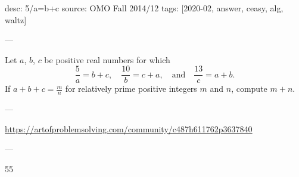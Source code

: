 desc: 5/a=b+c
source: OMO Fall 2014/12
tags: [2020-02, answer, ceasy, alg, waltz]

---

Let $a$, $b$, $c$ be positive real numbers for which\[
    \frac{5}{a} = b+c, \quad
    \frac{10}{b} = c+a, \quad \text{and} \quad
    \frac{13}{c} = a+b.
\]
If $a+b+c = \frac mn$ for relatively prime positive integers $m$ and $n$, compute $m+n$.

---

\url{https://artofproblemsolving.com/community/c487h611762p3637840}

---

55
